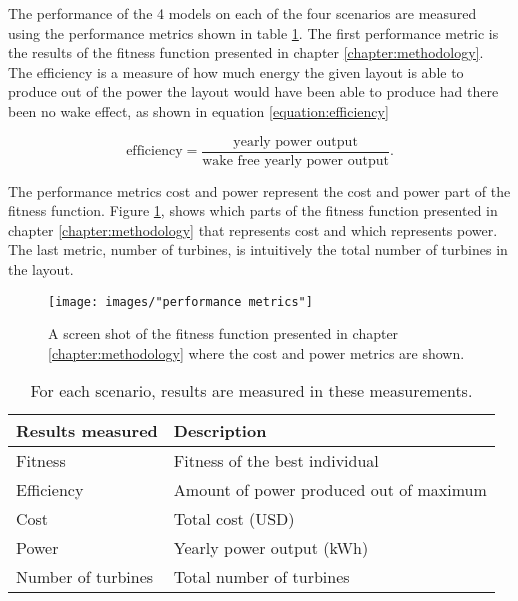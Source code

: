 \noindent The performance of the 4 models on each of the four scenarios are measured using the performance metrics shown in table \ref{table:performance metrics}. The first performance metric is the results of the fitness function presented in chapter \ref{chapter:methodology}. The efficiency is a measure of how much energy the given layout is able to produce out of the power the layout would have been able to produce had there been no wake effect, as shown in equation \ref{equation:efficiency}

\begin{equation}
\textrm{efficiency} = \frac{\textrm{yearly power output}}{\textrm{wake free yearly power output}}.
\label{equation:efficiency}
\end{equation}

\noindent The performance metrics cost and power represent the cost and power part of the fitness function. Figure \ref{figure:performance metrics cost and power}, shows which parts of the fitness function presented in chapter \ref{chapter:methodology} that represents cost and which represents power. The last metric, number of turbines, is intuitively the total number of turbines in the layout.\\ 

\begin{figure}[h!]
\begin{center}
\texttt{[image: images/"performance metrics"]}
\caption{A screen shot of the fitness function presented in chapter \ref{chapter:methodology} where the cost and power metrics are shown.}
\label{figure:performance metrics cost and power}
\end{center}
\end{figure}

\begin{table}[h!]
\centering
\caption{For each scenario, results are measured in these measurements.}
\label{table:performance metrics}
\centering
\begin{tabular}{l|l}
\textbf{Results measured}   & \textbf{Description} \\
\hline
Fitness                     & Fitness of the best individual \\
Efficiency                  & Amount of power produced out of maximum \\
Cost                        & Total cost (USD)\\
Power                       & Yearly power output (kWh) \\
Number of turbines          & Total number of turbines
\end{tabular}
\end{table}

